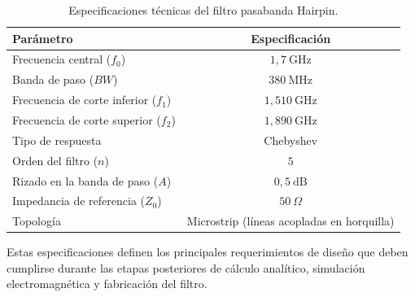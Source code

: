 \begin{table}[H]
\centering
\begin{tabular}{lc}
\hline
\textbf{Parámetro} & \textbf{Especificación} \\
\hline
Frecuencia central ($f_0$) & $1{,}7~\mathrm{GHz}$ \\
Banda de paso ($BW$) & $380~\mathrm{MHz}$ \\
Frecuencia de corte inferior ($f_1$) & $1{,}510~\mathrm{GHz}$ \\
Frecuencia de corte superior ($f_2$) & $1{,}890~\mathrm{GHz}$ \\
Tipo de respuesta & Chebyshev \\
Orden del filtro ($n$) & $5$ \\
Rizado en la banda de paso ($A$) & $0{,}5~\mathrm{dB}$ \\
Impedancia de referencia ($Z_0$) & $50~\Omega$ \\
Topología & Microstrip (líneas acopladas en horquilla) \\
\hline
\end{tabular}
\caption{Especificaciones técnicas del filtro pasabanda Hairpin.}
\label{tab:especificaciones_hairpin}
\end{table}

Estas especificaciones definen los principales requerimientos de diseño que deben cumplirse durante las etapas posteriores de cálculo analítico, simulación electromagnética y fabricación del filtro.
